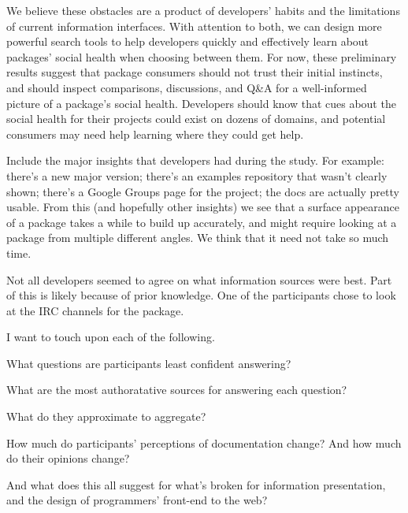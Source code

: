 We believe these obstacles are a product of developers' habits and the limitations of current information interfaces.
With attention to both, we can design more powerful search tools to help developers quickly and effectively learn about packages' social health when choosing between them.
For now, these preliminary results suggest that
package consumers should not trust their initial instincts,
and should inspect comparisons, discussions, and Q\&A for a well-informed picture of a package's social health.
Developers should know that cues about the social health for their projects could exist on dozens of domains,
and potential consumers may need help learning where they could get help.

Include the major insights that developers had during the study.
For example:
there's a new major version;
there's an examples repository that wasn't clearly shown;
there's a Google Groups page for the project;
the docs are actually pretty usable.
From this (and hopefully other insights) we see that a surface appearance of a package takes a while to build up accurately, and might require looking at a package from multiple different angles.
We think that it need not take so much time.

Not all developers seemed to agree on what information sources were best.
Part of this is likely because of prior knowledge.
One of the participants chose to look at the IRC channels for the package.

I want to touch upon each of the following.

What questions are participants least confident answering?

What are the most authoratative sources for answering each question?

What do they approximate to aggregate?

How much do participants' perceptions of documentation change?  And how much do their opinions change?

And what does this all suggest for what's broken for information presentation, and the design of programmers' front-end to the web?
\fi
